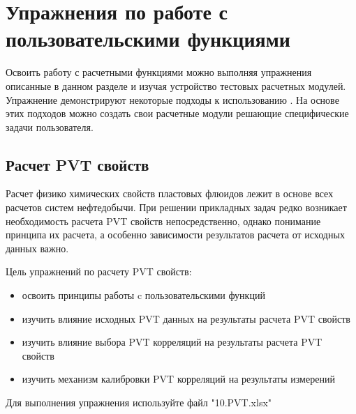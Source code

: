 \chapter{Упражнения по работе с пользовательскими функциями \unf}

Освоить работу с расчетными функциями \unf{} можно выполняя упражнения описанные в данном разделе и изучая устройство тестовых расчетных модулей. Упражнение демонстрируют некоторые подходы к использованию \unf. На основе этих подходов можно создать свои расчетные модули решающие специфические задачи пользователя. 

\section{Расчет PVT свойств}

Расчет физико химических свойств пластовых флюидов лежит в основе всех расчетов систем нефтедобычи. При решении прикладных задач редко возникает необходимость расчета PVT свойств непосредственно, однако понимание принципа их расчета, а особенно зависимости результатов расчета от исходных данных важно.
	
Цель упражнений по расчету PVT свойств:
\begin{itemize}	
	\item 	освоить принципы работы c пользовательскими функций \unf 
	\item 	изучить влияние исходных PVT данных на результаты расчета PVT свойств
	\item 	изучить влияние выбора PVT корреляций на результаты расчета PVT свойств
	\item 	изучить механизм калибровки PVT корреляций на результаты измерений
\end{itemize}
	 

Для выполнения упражнения используйте файл "10.PVT.xlsx"

